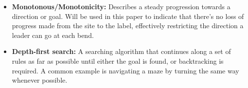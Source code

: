 \documentclass[11pt,a4paper]{vutinfth}
\begin{document}
\begin{itemize}
 
 
  \item \textbf{Monotonous/Monotonicity:} Describes a steady progression towards a direction or goal. Will be used in this paper to indicate that there's no loss of progress made from the site to the label, effectively restricting the direction a leader can go at each bend.
  \item \textbf{Depth-first search:} A searching algorithm that continues along a set of rules as far as possible until either the goal is found, or backtracking is required. A common example is navigating a maze by turning the same way whenever possible.
\end{itemize}
\end{document}
